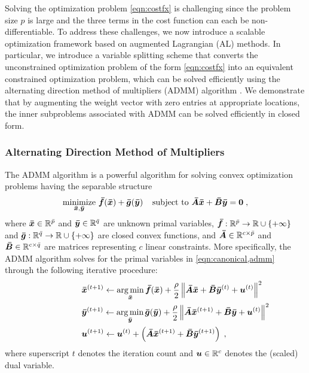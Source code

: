 Solving the optimization problem \eqref{eqn:costfx} is challenging since the problem size $p$ is large and the three terms {in the cost function} can each be \mbox{non-differentiable}.
To address these challenges, we now introduce a scalable optimization framework based on augmented Lagrangian (AL) methods.
In particular, we introduce a variable splitting scheme that converts the unconstrained optimization problem of the form \eqref{eqn:costfx} into an equivalent constrained optimization problem, which can be solved efficiently using the alternating direction method of multipliers (ADMM) algorithm \citep{Boyd:2011,Glowinski:1975, Gabay:1976}. 
We demonstrate that by augmenting the weight vector with zero entries at appropriate locations, the inner subproblems associated with ADMM can be solved efficiently in closed form.

\subsubsection{Alternating Direction Method of Multipliers}
The ADMM algorithm is a powerful algorithm for solving convex optimization problems having the separable structure \citep{Boyd:2011}
\begin{equation}
	\operatorname*{minimize}_{{\bm{\bar{x}}},{\bm{\bar{y}}}}\,{\bm{\bar{f}}}({\bm{\bar{x}}}) + {\bm{\bar{g}}}({\bm{\bar{y}}}) \;\;\;\; 
	\text{subject to } {\ensuremath{\bm{\bar{A}}}}{\ensuremath{\bm{\bar{x}}}}+{\bm{\bar{B}}}{\bm{\bar{y}}}={\bm{0}} \;,
	\label{eqn:canonical,admm}
\end{equation}
where ${\bm{\bar{x}}}\in\mathbb{R}^{\bar{p}}$ and ${\bm{\bar{y}}}\in\mathbb{R}^{\bar{q}}$ are unknown primal variables, ${\bm{\bar{f}}}:\mathbb{R}^{\bar{p}}\to\mathbb{R}\cup\{+\infty\}$ and ${\bm{\bar{g}}}:\mathbb{R}^{\bar{q}}\to\mathbb{R}\cup\{+\infty\}$ are closed convex functions, and ${\bm{\bar{A}}}\in\mathbb{R}^{c\times {\ensuremath{\bar{p}}}}$ and ${\bm{\bar{B}}}\in\mathbb{R}^{c\times {\ensuremath{\bar{q}}}}$ are matrices representing $c$ linear constraints.  
More specifically, the ADMM algorithm solves for the primal variables in \eqref{eqn:canonical,admm} through the following iterative procedure:
\begin{align}
	&\hspace{0.17\linewidth}\xbar\iterp\leftarrow\displaystyle\argmin{\xbar} \fbar(\xbar) + \frac{\rho}{2}\norm{\Abar\xbar + \Bbar\ybar\iter + \u\iter}^2 \label{eqn:admm,xbar,update}\\ 
	&\hspace{0.17\linewidth}\ybar\iterp\leftarrow\displaystyle\argmin{\ybar} \gbar(\ybar) + \frac{\rho}{2}\norm{\Abar\xbar\iterp + \Bbar\ybar + \u\iter}^2 \label{eqn:admm,ybar,update}\\ 
	&\hspace{0.17\linewidth}\u\iterp\leftarrow \u\iter+ \left(\Abar\xbar\iterp+\Bbar\ybar\iterp\right)  \; , & \label{eqn:admm,dual,update}
\end{align}
where superscript $t$ denotes the iteration count and ${\bm{u}}\in\mathbb{R}^c$ denotes the (scaled) dual variable.


